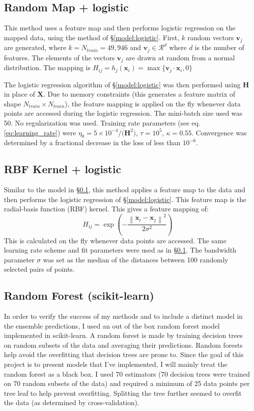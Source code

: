\documentclass{article} %
\newcommand{\norm}[1]{\left\lVert#1\right\rVert}
\newcommand*\mean[1]{\overline{#1}}
\newcommand{\vect}[1]{\mathbf{#1}}
\newcommand{\mat}[1]{\mathbf{#1}}
\begin{document}
\subsection{Random Map + logistic}
\label{model:random}
This method uses a feature map and then performs logistic regression on the mapped data, using the method of \S\ref{model:logistic}. First, $k$ random vectors $\vect{v}_j$ are generated, where $k = N_{train} = 49,946$ and $\vect{v}_j \in \mathcal{R}^d$ where $d$ is the number of features.  The elements of the vectors $\vect{v}_j$ are drawn at random from a normal distribution.  The mapping is $H_{ij} = h_j(\vect{x}_i) = \max\{\vect{v}_j \cdot \vect{x}_i, 0\}$

The logistic regression algorithm of \S\ref{model:logistic} was then performed using $\mat{H}$ in place of $\mat{X}$.  Due to memory constraints (this generates a feature matrix of shape $N_{train} \times N_{train}$), the feature mapping is applied on the fly whenever data points are accessed during the logistic regression.  The mini-batch size used was 50.  No regularization was used.  Training rate parameters (see eq.\ref{eq:learning_rate}) were $\eta_0 = 5\times10^{-4}/\mean(\mat{H}^2)$, $\tau=10^5$, $\kappa = 0.55$.   Convergence was determined by a fractional decrease in the loss of less than $10^{-6}$.

\subsection{RBF Kernel + logistic}
\label{model:rbf}
Similar to the model in \S\ref{model:random}, this method applies a feature map to the data and then performs the logistic regression of \S\ref{model:logistic}.  This feature map is the radial-basis function (RBF) kernel.  This gives a feature mapping of:
\begin{equation}
H_{ij} = \exp\left( -\frac{\norm{\vect{x}_i - \vect{x}_j}^2 }{2 \sigma^2} \right)
\end{equation}
This is calculated on the fly whenever data points are accessed. The same learning rate scheme and fit parameters were used as in \S\ref{model:random}.  The bandwidth parameter $\sigma$ was set as the median of the distances between 100 randomly selected pairs of points.

\subsection{Random Forest (scikit-learn)}
\label{model:randomforest}
In order to verify the success of my methods and to include a distinct model in the ensemble predictions, I used an out of the box random forest model implemented in scikit-learn.  A random forest is made by training decision trees on random subsets of the data and averaging their predictions.  Random forests help avoid the overfitting that decision trees are prone to. Since the goal of this project is to present models that I've implemented, I will mainly treat the random forest as a black box.  I used 70 estimators (70 decision trees were trained on 70 random subsets of the data) and required a minimum of 25 data points per tree leaf to help prevent overfitting.  Splitting the tree further seemed to overfit the data (as determined by cross-validation).
\end{document}

